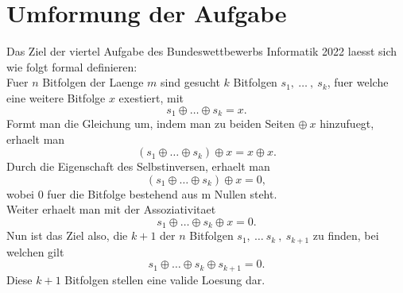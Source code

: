 \documentclass[a4paper,10pt,ngerman]{scrartcl}
\begin{document}
\section{Umformung der Aufgabe}
Das Ziel der viertel Aufgabe des Bundeswettbewerbs Informatik 2022 laesst sich wie folgt formal definieren:\\
Fuer \(n\) Bitfolgen der Laenge \(m\) sind gesucht \(k\) Bitfolgen \(s_1, \ \dots \ , \ s_k\), fuer welche eine weitere Bitfolge \(x\) exestiert, mit
\[s_1 \oplus \dots \oplus s_k = x. \] 
Formt man die Gleichung um, indem man zu beiden Seiten \(\oplus \ x \) hinzufuegt, erhaelt man
\[(s_1 \oplus \dots \oplus s_k) \oplus x = x \oplus x . \] 
Durch die Eigenschaft des Selbstinversen, erhaelt man
\[(s_1 \oplus \dots \oplus s_k) \oplus x = 0,  \] 
wobei 0 fuer die Bitfolge bestehend aus m Nullen steht.\\
Weiter erhaelt man mit der Assoziativitaet
\[s_1 \oplus \dots \oplus s_k \oplus x = 0 . \] 
Nun ist das Ziel also, die \(k + 1\) der \(n\) Bitfolgen \(s_1, \ \dots \ s_k \ , \ s_{k+1}\) zu finden, bei welchen gilt
\[s_1 \oplus \dots \oplus s_k \oplus s_{k+1} = 0 . \] 
Diese \(k + 1\) Bitfolgen stellen eine valide Loesung dar.
\end{document}
